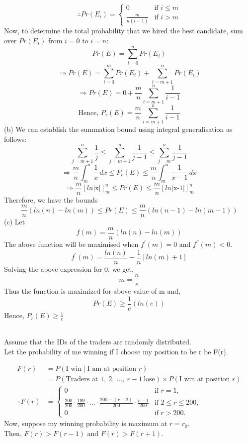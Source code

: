 \documentclass[a4paper,12pt,answers]{exam}
\begin{document}
\begin{questions}
\begin{solution}
\[
\therefore Pr(E_i)=\begin{cases} 
0 & \text{if } i \leq m\\
\frac{m}{n(i-1)} & \text{if } i > m
\end{cases}
\]
Now, to determine the total probability that we hired the best candidate, sum over $Pr(E_{i})$ from $i=0$ to $i=n$:
\[
Pr(E)=\sum_{i=0}^{n}{Pr(E_{i})}
\]
\[
\Rightarrow Pr(E)=\sum_{i=0}^{m}{Pr(E_{i})} +\sum_{i=m+1}^{n}{Pr(E_{i})}
\]
\[
\Rightarrow Pr(E)=0 + \frac{m}{n} \sum_{i=m+1}^{n} {\frac{1}{i-1}} 
\]
\[
\text{Hence, } P_{r}(E)= \frac{m}{n} \sum_{i=m+1}^{n} {\frac{1}{i-1}}
\]
(b) We can establish the summation bound using integral generalisation as follows:
\[
\sum_{j=m+1}^{n}{\frac{1}{j}} \leq \sum_{j=m+1}^{n} {\frac{1}{j-1}} \leq \sum_{j=m}^{n}{\frac{1}{j-1}}
\]
\newline
\[
\Rightarrow \frac{m}{n}\int_{m}^{n} \frac{1}{x} \,dx  \leq P_{r}(E) \leq \frac{m}{n}\int_{m}^{n} \frac{1}{x-1} \,dx
\]
\newline
\[
\Rightarrow \frac{m}{n}[ln\vert \text{x}\vert]_{m}^{n} \leq P{r}(E) \leq \frac{m}{n}[ln\vert \text{x-1}\vert]_{m}^{n}
\]
\newline
Therefore, we have the bounds
\[
\frac{m}{n}(ln(n)-ln(m)) \leq Pr(E) \leq \frac{m}{n} (ln(n-1)-ln(m-1))
\]
(c) Let \[ f(m)= \frac{m}{n}(ln(n)-ln(m))\]
The above function will be maximised when $f^{'}(m)=0$ and $f^{''}(m)<0$.
\[
f^{'}(m)= \frac{ln(n)}{n}-\frac{1}{n}[ln(m) + 1]
\]
Solving the above expression for 0, we get,
\[
m=\frac{n}{e}
\]
Thus the function is maximized for above value of m and,
\[
Pr(E) \geq \frac{1}{e}(ln(e))
\] 
Hence, $P_{r}(E) \geq \frac{1}{e}$
\end{solution}


\begin{solution}\\
Assume that the IDs of the traders are randomly distributed.\\
Let the probability of me winning if I choose my position to be r be F(r).

\[
\begin{aligned}
F(r) &= P\left(\text{I win} \mid \text{I am at position } r\right) \\
&= P\left(\text{Traders at } 1,\ 2,\ \ldots,\ r-1\ \text{lose}\right) \times P\left(\text{I win at position } r\right)\\
\therefore F(r) &=
\begin{cases} 
0 & \text{if } r = 1, \\
\frac{200}{200} \cdot \frac{199}{200} \cdot \ldots \cdot \frac{200-(r-2)}{200} \cdot \frac{r - 1}{200} & \text{if } 2 \leq r \leq 200, \\
0 & \text{if } r > 200.
\end{cases}
\end{aligned}
\]
Now, suppose my winning probability is maximum at $r=r_0$.\\
Then, $F(r) > F(r-1)$ and $F(r)>F(r+1)$.


\end{solution}
\end{questions}
\end{document}
